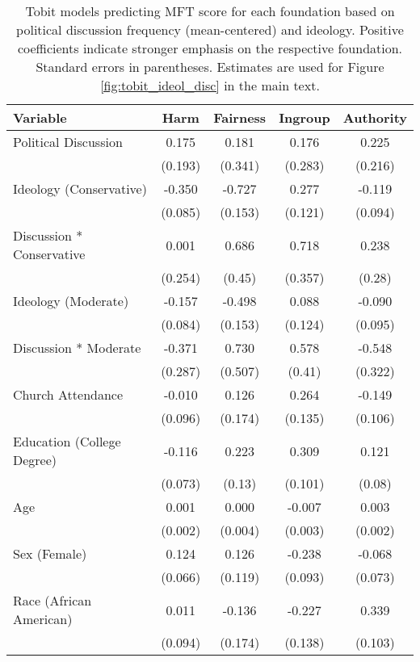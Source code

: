 \begin{table}[ht]
\centering
\caption{Tobit models predicting MFT score for each foundation based 
           on political discussion frequency (mean-centered) and ideology. Positive coefficients 
           indicate stronger emphasis on the respective foundation. Standard errors in parentheses. 
           Estimates are used for Figure \ref{fig:tobit_ideol_disc} in the main text.} 
\label{tab:tobit_ideol_disc}
\begingroup\footnotesize
\begin{tabular}{lcccc}
  \hline
Variable & Harm & Fairness & Ingroup & Authority \\ 
  \hline
Political Discussion &  0.175 &  0.181 &  0.176 &  0.225 \\ 
   & (0.193) & (0.341) & (0.283) & (0.216) \\ 
  Ideology (Conservative) & -0.350 & -0.727 &  0.277 & -0.119 \\ 
   & (0.085) & (0.153) & (0.121) & (0.094) \\ 
  Discussion * Conservative &  0.001 &  0.686 &  0.718 &  0.238 \\ 
   & (0.254) & (0.45) & (0.357) & (0.28) \\ 
  Ideology (Moderate) & -0.157 & -0.498 &  0.088 & -0.090 \\ 
   & (0.084) & (0.153) & (0.124) & (0.095) \\ 
  Discussion * Moderate & -0.371 &  0.730 &  0.578 & -0.548 \\ 
   & (0.287) & (0.507) & (0.41) & (0.322) \\ 
  Church Attendance & -0.010 &  0.126 &  0.264 & -0.149 \\ 
   & (0.096) & (0.174) & (0.135) & (0.106) \\ 
  Education (College Degree) & -0.116 &  0.223 &  0.309 &  0.121 \\ 
   & (0.073) & (0.13) & (0.101) & (0.08) \\ 
  Age &  0.001 &  0.000 & -0.007 &  0.003 \\ 
   & (0.002) & (0.004) & (0.003) & (0.002) \\ 
  Sex (Female) &  0.124 &  0.126 & -0.238 & -0.068 \\ 
   & (0.066) & (0.119) & (0.093) & (0.073) \\ 
  Race (African American) &  0.011 & -0.136 & -0.227 &  0.339 \\ 
   & (0.094) & (0.174) & (0.138) & (0.103) \\ 

\end{tabular}
\end{table}
